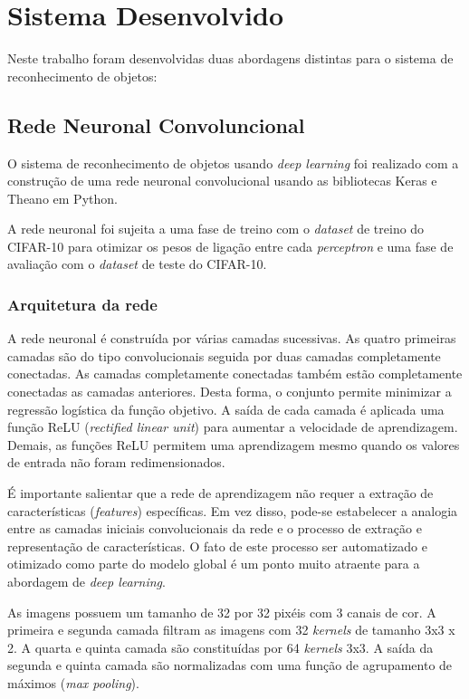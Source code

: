 \documentclass[extendedabs]{vcom}
\begin{document}
\section{Sistema Desenvolvido}
Neste trabalho foram desenvolvidas duas abordagens distintas para o sistema de reconhecimento de objetos:

\subsection{Rede Neuronal Convoluncional}
O sistema de reconhecimento de objetos usando \textit{deep learning} foi realizado com a construção de uma rede neuronal convolucional usando as bibliotecas Keras e Theano em Python.

A rede neuronal foi sujeita a uma fase de treino com o \textit{dataset} de treino do CIFAR-10 para otimizar os pesos de ligação entre cada \textit{perceptron} e uma fase de avaliação com o \textit{dataset} de teste do CIFAR-10.

\subsubsection{Arquitetura da rede}
A rede neuronal é construída por várias camadas sucessivas. As quatro primeiras camadas são do tipo convolucionais seguida por duas camadas completamente conectadas. As camadas completamente conectadas também estão completamente conectadas as camadas anteriores. Desta forma, o conjunto permite minimizar a regressão logística da função objetivo. A saída de cada camada é aplicada uma função ReLU (\textit{rectified linear unit}) para aumentar a velocidade de aprendizagem. Demais, as funções ReLU permitem uma aprendizagem mesmo quando os valores de entrada não foram redimensionados.

É importante salientar que a rede de aprendizagem não requer a extração de características (\textit{features}) específicas. Em vez disso, pode-se estabelecer a analogia entre as camadas iniciais convolucionais da rede e o processo de extração e representação de características. O fato de este processo ser automatizado e otimizado como parte do modelo global é um ponto muito atraente para a abordagem de \textit{deep learning}.

As imagens possuem um tamanho de 32 por 32 pixéis com 3 canais de cor. A primeira e segunda camada filtram as imagens com 32 \textit{kernels} de tamanho 3x3 x 2. A quarta e quinta camada são constituídas por 64 \textit{kernels} 3x3. A saída da segunda e quinta camada são normalizadas com uma função de agrupamento de máximos (\textit{max pooling}).
\end{document}
